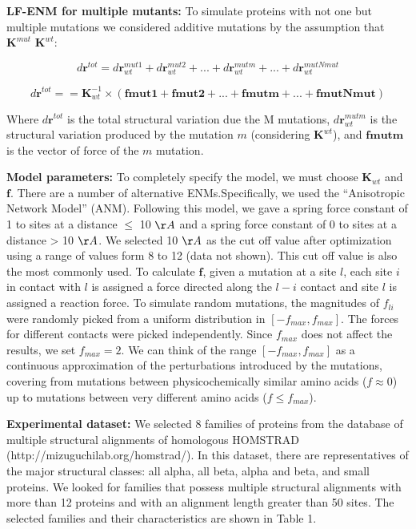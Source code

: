 \documentclass{article}
\begin{document}
{\bf LF-ENM for multiple mutants: }
To simulate proteins with not one but multiple mutations we considered additive mutations by the assumption that $\mathbf{K}^{mut}$ \cong $\mathbf{K}^{wt}$:

\begin{equation}
d\mathbf{r}^{tot} = d\mathbf{r}^{mut1}_{wt}+d\mathbf{r}^{mut2}_{wt}+ ...+d\mathbf{r}^{mutm}_{wt}+...+d\mathbf{r}^{mutNmut}_{wt}
\end{equation}

\begin{equation}
d\mathbf{r}^{tot} = =\mathbf{K}^{-1}_{wt}\times(\mathbf{fmut1}+\mathbf{fmut2}+...+\mathbf{fmutm}+...+\mathbf{fmutNmut}) 
\end{equation}

Where $d\mathbf{r}^{tot}$ is the total structural variation due the M mutations, $d\mathbf{r}^{mutm}_{wt}$ is the structural variation produced by the mutation $m$ (considering $\mathbf{K}^{wt}$), and $\mathbf{fmutm}$ is the vector of force of the $m$ mutation.

{\bf Model parameters: }
To completely specify the model, we must choose $\mathbf{K}_{wt}$ and $\mathbf{f}$. There are a number of alternative ENMs.Specifically, we used the ``Anisotropic Network Model'' (ANM). Following this model, we gave a spring force constant of 1 to sites at a distance $\leq$ 10 $\AA$ and a spring force constant of 0 to sites at a distance > 10 $\AA$. We selected 10 $\AA$ as the cut off value after optimization using a range of values form 8 to 12 (data not shown). This cut off value is also the most commonly used.
To calculate $\mathbf{f}$, given a mutation at a site $l$, each site $i$ in contact with $l$ is assigned a force directed along the $l-i$ contact and site $l$ is assigned a reaction force. To simulate random mutations, the magnitudes of $f_{li}$ were randomly picked from a uniform distribution in $[-f_{max},f_{max}]$. The forces for different contacts were picked independently. Since $f_{max}$ does not affect the results, we set
$f_{max} = 2$. We can think of the range $[-f_{max}, f_{max}]$ as a continuous approximation of the perturbations introduced by the mutations, covering
from mutations between physicochemically similar amino acids ($f \approx 0$) up to mutations between very different amino acids ($f \leq f_{max}$).

{\bf Experimental dataset:}
We selected 8 families of proteins from the database of multiple structural alignments of homologous HOMSTRAD (http://mizuguchilab.org/homstrad/). In this dataset, there are representatives of the major structural classes: all alpha, all beta, alpha and beta, and small proteins. We looked for families that possess multiple structural alignments with more than 12 proteins and with an alignment length greater than 50 sites. The selected families and their characteristics are shown in Table 1.
\end{document}
